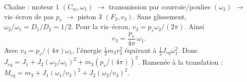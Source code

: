 \begin{corrigebox}
Chaîne : moteur 1 $(C_m,\omega_1)$ $\rightarrow$ transmission par
                courroie/poulies $(\omega_2)$ $\rightarrow$ vis--écrou de pas $p_v$
                $\rightarrow$ piston 3 $(F_3,v_3)$.
Sans glissement, $\omega_2/\omega_1=D_1/D_2=1/2$. Pour la vis--écrou,
                $v_3=p_v\omega_2/(2\pi)$. Ainsi
                \[\boxed{v_3=\frac{p_v}{4\pi}\,\omega_1}.\]
Avec $v_3=p_v/(4\pi)\omega_1$, l'énergie $\tfrac12m_3v_3^2$ équivaut à
                $\tfrac12J_{eq}\omega_1^2$. Donc
                $J_{eq}=J_1+J_2(\omega_2/\omega_1)^2+m_3(p_v/(4\pi))^2$.
Ramenée à la translation :
                $M_{eq}=m_3+J_1(\omega_1/v_3)^2+J_2(\omega_2/v_3)^2$.
\end{corrigebox}
